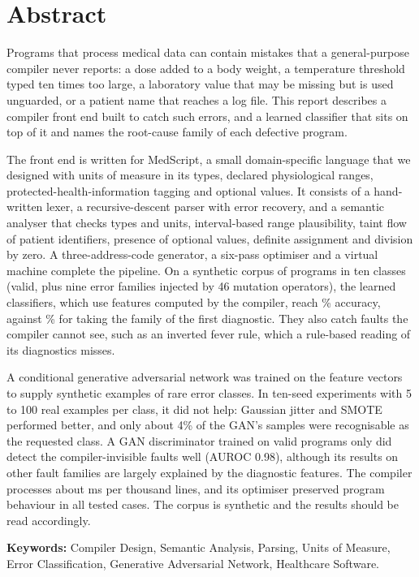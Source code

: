\section*{Abstract}

Programs that process medical data can contain mistakes that a general-purpose compiler never reports: a dose added to a
body weight, a temperature threshold typed ten times too large, a laboratory value that may be missing but is used
unguarded, or a patient name that reaches a log file. This report describes a compiler front end built to catch such
errors, and a learned classifier that sits on top of it and names the root-cause family of each defective program.

The front end is written for MedScript, a small domain-specific language that we designed with units of measure in its types,
declared physiological ranges, protected-health-information tagging and optional values. It consists of a hand-written lexer,
a recursive-descent parser with error recovery, and a semantic analyser that checks types and units, interval-based range
plausibility, taint flow of patient identifiers, presence of optional values, definite assignment and division by zero. A
three-address-code generator, a six-pass optimiser and a virtual machine complete the pipeline. On a synthetic corpus of
\NProg{} programs in ten classes (valid, plus nine error families injected by 46 mutation operators), the learned
classifiers, which use features computed by the compiler, reach \RFAcc\% accuracy, against \RuleFirstAcc\% for taking the family of the first
diagnostic. They also catch faults the compiler cannot see, such as an inverted fever rule, which a rule-based reading of its diagnostics misses.

A conditional generative adversarial network was trained on the feature vectors to supply synthetic examples of rare error classes.
In ten-seed experiments with 5 to 100 real examples per class, it did not help: Gaussian jitter and SMOTE performed better, and only
about 4\% of the GAN's samples were recognisable as the requested class. A GAN discriminator trained on valid programs only did
detect the compiler-invisible faults well (AUROC 0.98), although its results on other fault families are largely explained by the diagnostic features.
The compiler processes about \MsPerKloc{} ms per thousand lines, and its optimiser preserved program behaviour in all tested cases.
The corpus is synthetic and the results should be read accordingly.

\vspace{0.4em}
\textbf{Keywords:}
Compiler Design, Semantic Analysis, Parsing, Units of Measure, Error Classification, Generative Adversarial Network,
Healthcare Software.

\newpage
